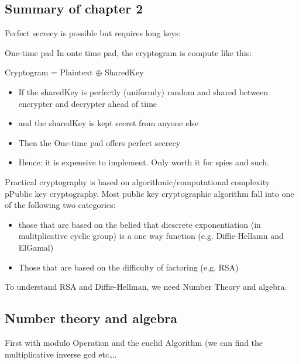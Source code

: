 \subsection{Summary of chapter 2}
Perfect secrecy is possible but requires long keys:
\begin{parag}{One-time pad}
    In onte time pad, the cryptogram is compute like this:
    \begin{center}
        Cryptogram = Plaintext $ \oplus$ SharedKey
    \end{center}
    \begin{itemize}
        \item If the sharedKey is perfectly (uniformly) random and shared between encrypter and decrypter ahead of time
        \item and the sharedKey is kept secret from anyone else
        \item Then the One-time pad offers perfect secrecy
        \item Hence: it is expensive to implement. Only worth it for spies and such.
        
    \end{itemize}
\end{parag}
Practical cryptography is based on algorithmic/computational complexity\\
pPublic key cryptography. Most public key cryptographic algorithm fall into one of the following two categories:
\begin{itemize}
    \item those that are based on the belied that diescrete exponentiation (in mulitplicative cyclic group) is a one way function (e.g. Diffie-Hellamn and ElGamal)
    \item Those that are based on the difficulty of factoring (e.g. RSA)
\end{itemize}
To understand RSA and Diffie-Hellman, we need Number Theory and algebra.\subsection{Number theory and algebra}
First with modulo Operation and the euclid Algorithm (we can find the multiplicative inverse gcd etc\ldots.
